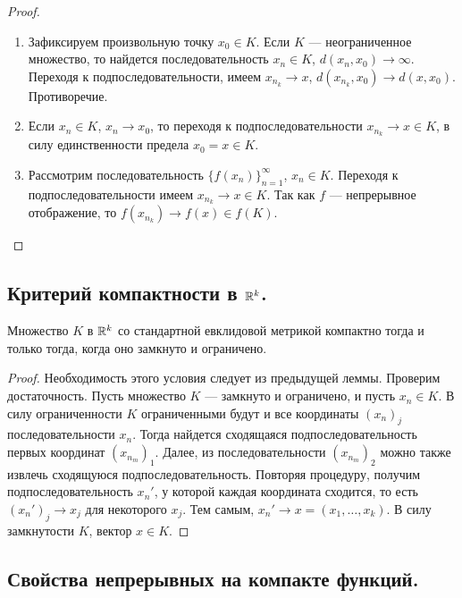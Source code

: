 \documentclass[a4paper]{article}
\theoremstyle{named}
\begin{document}
    \begin{proof}
        ~

        \begin{enumerate}
        \item
            Зафиксируем произвольную точку $x_0 \in K$. Если $K$ --- неограниченное множество, то найдется последовательность $x_n \in K$, $d(x_n, x_0) \to \infty$. Переходя к подпоследовательности, имеем $x_{n_k} \to x$, $d(x_{n_k}, x_0) \to d(x, x_0)$. Противоречие.

        \item
            Если $x_n \in K$, $x_n \to x_0$, то переходя к подпоследовательности $x_{n_k} \to x \in K$, в силу единственности предела $x_0 = x \in K$.

        \item
            Рассмотрим последовательность $\{f(x_n)\}_{n = 1}^{\infty}$, $x_n \in K$. Переходя к подпоследовательности имеем $x_{n_k} \to x \in K$. Так как $f$ --- непрерывное отображение, то $f(x_{n_k}) \to f(x) \in f(K)$.
        \end{enumerate}
    \end{proof}

    \subsection{Критерий компактности в $\mathbb{R}^k$.}

    \begin{proposal*}
        Множество $K$ в $\mathbb{R}^k$ со стандартной евклидовой метрикой компактно тогда и только тогда, когда оно замкнуто и ограничено.
    \end{proposal*}

    \begin{proof}
        Необходимость этого условия следует из предыдущей леммы. Проверим достаточность. Пусть множество $K$ --- замкнуто и ограничено, и пусть $x_n \in K$. В силу ограниченности $K$ ограниченными будут и все координаты $(x_n)_j$ последовательности $x_n$. Тогда найдется сходящаяся подпоследовательность первых координат $(x_{n_m})_1$. Далее, из последовательности $(x_{n_m})_2$ можно также извлечь сходящуюся подпоследовательность. Повторяя процедуру, получим подпоследовательность $x_n'$, у которой каждая координата сходится, то есть $(x_n')_j \to x_j$ для некоторого $x_j$. Тем самым, $x_n' \to x = (x_1, \dots, x_k)$. В силу замкнутости $K$, вектор $x \in K$.
    \end{proof}

    \subsection{Свойства непрерывных на компакте функций.}
\end{document}
